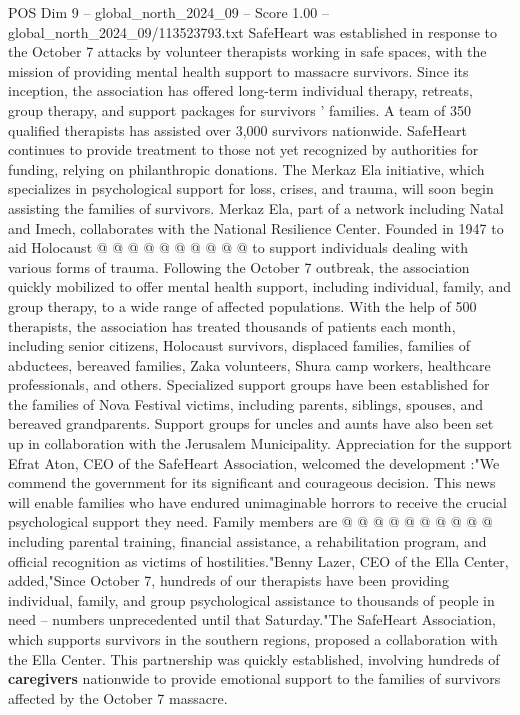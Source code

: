 \begin{textsample}{POS Dim 9 – global\_north\_2024\_09 – Score 1.00 – global\_north\_2024\_09/113523793.txt}
SafeHeart was established in response to the October 7 attacks by volunteer therapists working in safe spaces, with the mission of providing mental health support to massacre survivors.
Since its inception, the association has offered long-term individual therapy, retreats, group therapy, and support packages for survivors ' families.
A team of 350 qualified therapists has assisted over 3,000 survivors nationwide.
SafeHeart continues to provide treatment to those not yet recognized by authorities for funding, relying on philanthropic donations.
The Merkaz Ela initiative, which specializes in psychological support for loss, crises, and trauma, will soon begin assisting the families of survivors.
Merkaz Ela, part of a network including Natal and Imech, collaborates with the National Resilience Center.
Founded in 1947 to aid Holocaust @ @ @ @ @ @ @ @ @ @ to support individuals dealing with various forms of trauma.
Following the October 7 outbreak, the association quickly mobilized to offer mental health support, including individual, family, and group therapy, to a wide range of affected populations.
With the help of 500 therapists, the association has treated thousands of patients each month, including senior citizens, Holocaust survivors, displaced families, families of abductees, bereaved families, Zaka volunteers, Shura camp workers, healthcare professionals, and others.
Specialized support groups have been established for the families of Nova Festival victims, including parents, siblings, spouses, and bereaved grandparents.
Support groups for uncles and aunts have also been set up in collaboration with the Jerusalem Municipality.
Appreciation for the support Efrat Aton, CEO of the SafeHeart Association, welcomed the development :"We commend the government for its significant and courageous decision.
This news will enable families who have endured unimaginable horrors to receive the crucial psychological support they need.
Family members are @ @ @ @ @ @ @ @ @ @ including parental training, financial assistance, a rehabilitation program, and official recognition as victims of hostilities."Benny Lazer, CEO of the Ella Center, added,"Since October 7, hundreds of our therapists have been providing individual, family, and group psychological assistance to thousands of people in need -- numbers unprecedented until that Saturday."The SafeHeart Association, which supports survivors in the southern regions, proposed a collaboration with the Ella Center.
This partnership was quickly established, involving hundreds of \textbf{caregivers} nationwide to provide emotional support to the families of survivors affected by the October 7 massacre.

\end{textsample}
